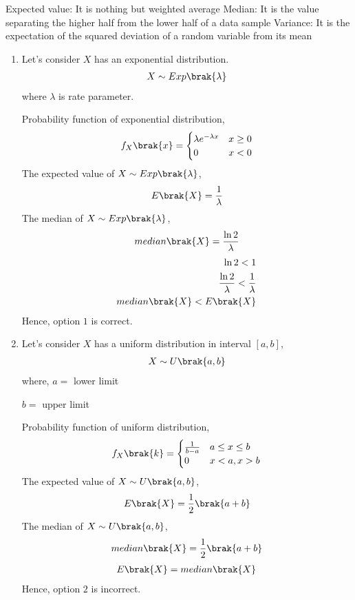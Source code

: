 Expected value:
It is nothing but weighted average
Median:
It is the value separating the higher half from the lower half of a data sample
Variance:
It is the expectation of the squared deviation of a random variable from its mean
\begin{enumerate}
    \item Let's consider $X$ has an exponential distribution.
    \begin{align}
        X \sim Exp\brak{\lambda}
    \end{align}
    where $\lambda$ is rate parameter.
    
    Probability function of exponential distribution,
    \begin{align}
        f_X\brak{x}=
        \begin{cases}
            \lambda e^{-\lambda x} & x\geq0\\
            0 & x<0
        \end{cases}
    \end{align}
    The expected value of $X \sim Exp\brak{\lambda}$,
    \begin{align}
        E\brak{X}=\frac{1}{\lambda}
    \end{align}
    The median of $X \sim Exp\brak{\lambda}$,
    \begin{align}
        median\brak{X}=\frac{\ln{2}}{\lambda}
    \end{align}
    \begin{align}
        \ln{2}<1\\
        \frac{\ln{2}}{\lambda}<\frac{1}{\lambda}\\
         median\brak{X}<E\brak{X}
    \end{align}
    Hence, option $1$ is correct.
    
    \item Let's consider $X$ has a uniform distribution in interval $[a,b]$,
    \begin{align}
        X \sim U\brak{a,b}
    \end{align}
    where,
    $a=$ lower limit
    
    $b=$ upper limit
    
    Probability function of uniform distribution,
    \begin{align}
        f_X\brak{k}=
        \begin{cases}
            \frac{1}{b-a} & a\leq x\leq b\\
            0 & x < a, x > b
        \end{cases}
    \end{align}
    The expected value of $X \sim U\brak{a,b}$,
    \begin{align}
        E\brak{X}=\frac{1}{2}\brak{a+b}
    \end{align}
    The median of $X \sim U\brak{a,b}$,
    \begin{align}
        median\brak{X}=\frac{1}{2}\brak{a+b}
    \end{align}
    \begin{align}
        E\brak{X}=median\brak{X}
    \end{align}
    Hence, option $2$ is incorrect.
    

\end{enumerate}
